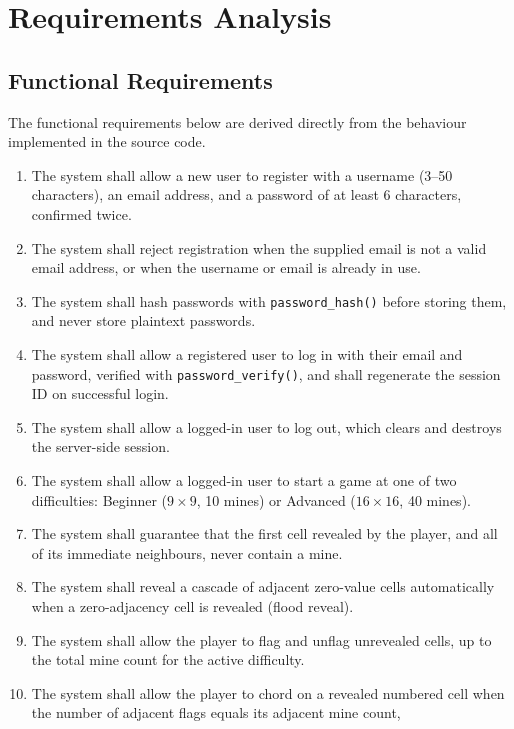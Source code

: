 \chapter{Requirements Analysis}
\label{ch:requirements}

\section{Functional Requirements}
The functional requirements below are derived directly from the behaviour
implemented in the source code.

\begin{enumerate}[nosep]
    \item The system shall allow a new user to register with a username
    (3--50 characters), an email address, and a password of at least 6
    characters, confirmed twice.
    \item The system shall reject registration when the supplied email is
    not a valid email address, or when the username or email is already in
    use.
    \item The system shall hash passwords with \texttt{password\_hash()}
    before storing them, and never store plaintext passwords.
    \item The system shall allow a registered user to log in with their
    email and password, verified with \texttt{password\_verify()}, and shall
    regenerate the session ID on successful login.
    \item The system shall allow a logged-in user to log out, which clears
    and destroys the server-side session.
    \item The system shall allow a logged-in user to start a game at one of
    two difficulties: Beginner ($9\times9$, 10 mines) or Advanced
    ($16\times16$, 40 mines).
    \item The system shall guarantee that the first cell revealed by the
    player, and all of its immediate neighbours, never contain a mine.
    \item The system shall reveal a cascade of adjacent zero-value cells
    automatically when a zero-adjacency cell is revealed (flood reveal).
    \item The system shall allow the player to flag and unflag unrevealed
    cells, up to the total mine count for the active difficulty.
    \item The system shall allow the player to chord on a revealed numbered
    cell when the number of adjacent flags equals its adjacent mine count,

\end{enumerate}

